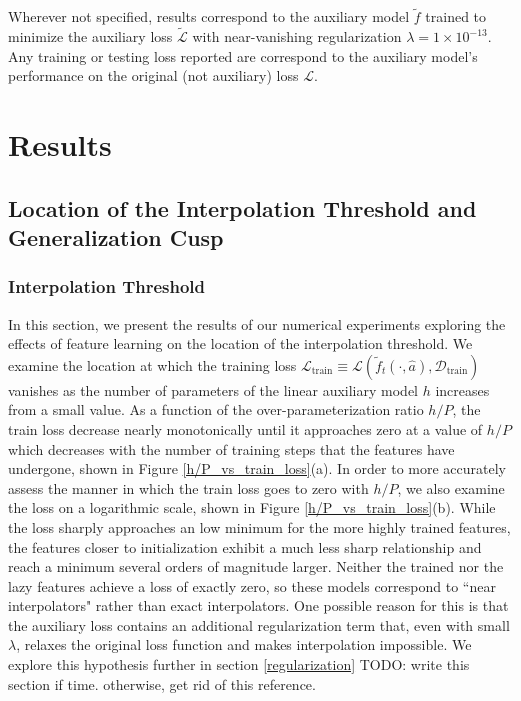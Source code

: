 \documentclass[11pt]{article}
\begin{document}
Wherever not specified, results correspond to the auxiliary model $\tilde f$ trained to minimize the auxiliary loss $\tilde{\mathcal{L}}$ with near-vanishing regularization $\lambda=1\times10^{-13}$. Any training or testing loss reported are correspond to the auxiliary model's performance on the original (not auxiliary) loss $\mathcal L$.

\section{Results}
\label{Results}

\subsection{Location of the Interpolation Threshold and Generalization Cusp}

\subsubsection{Interpolation Threshold}
In this section, we present the results of our numerical experiments exploring the effects of feature learning on the location of the interpolation threshold. We examine the location at which the training loss $\mathcal L_\text{train} \equiv \mathcal L (\tilde f_t(\cdot, \hat 
a), \mathcal D_\text{train})$ vanishes as the number of parameters of the linear auxiliary model $h$ increases from a small value. As a function of the over-parameterization ratio $h/P$, the train loss decrease nearly monotonically until it approaches zero at a value of $h/P$ which decreases with the number of training steps that the features have undergone, shown in Figure \ref{h/P_vs_train_loss}(a). In order to more accurately assess the manner in which the train loss goes to zero with $h/P$, we also examine the loss on a logarithmic scale, shown in Figure \ref{h/P_vs_train_loss}(b). While the loss sharply approaches an low minimum for the more highly trained features, the features closer to initialization exhibit a much less sharp relationship and reach a minimum several orders of magnitude larger. Neither the trained nor the lazy features achieve a loss of exactly zero, so these models correspond to ``near interpolators" rather than exact interpolators. One possible reason for this is that the auxiliary loss contains an additional regularization term that, even with small $\lambda$, relaxes the original loss function and makes interpolation impossible. We explore this hypothesis further in section \ref{regularization} TODO: write this section if time. otherwise, get rid of this reference.\\
\end{document}
